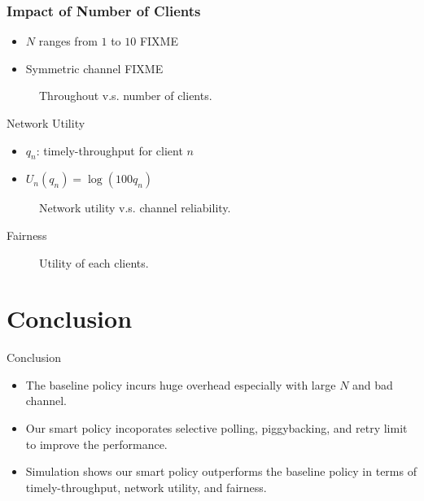 \documentclass{beamer}
\begin{document}
\begin{frame}
\frametitle{Impact of Number of Clients}
\begin{itemize}
\item $N$ ranges from $1$ to $10$ FIXME
\item Symmetric channel FIXME
\end{itemize}
\begin{figure}[htbp]
  \centering
  \caption{Throughout v.s. number of clients.}
\end{figure}
\end{frame}

\begin{frame}{Network Utility}
  \begin{itemize}
    \item $q_n$: timely-throughput for client $n$
    \item $U_n(q_n) = \log (100 q_n)$
  \end{itemize}
\begin{figure}[htbp]
  \centering
  \caption{Network utility v.s. channel reliability.}
\end{figure}
\end{frame}

\begin{frame}{Fairness}
\begin{figure}[htbp]
  \centering
  \caption{Utility of each clients.}
\end{figure}
\end{frame}

\section*{Conclusion}
\begin{frame}{Conclusion}
  \begin{itemize}
    \item The baseline policy incurs huge overhead especially with large $N$ and bad channel.
    \item Our smart policy incoporates selective polling, piggybacking, and
      retry limit to improve the performance.
    \item Simulation shows our smart policy outperforms the baseline policy in
      terms of timely-throughput, network utility, and fairness.
  \end{itemize}
\end{frame}
\end{document}

